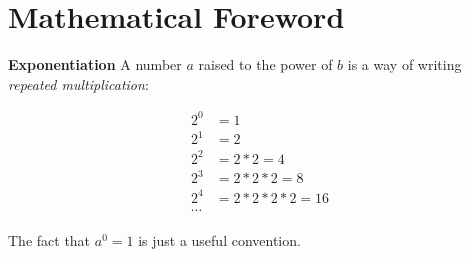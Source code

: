\chapter*{Mathematical Foreword}\label{chpt:mathforeword}

\textbf{Exponentiation} A number $a$ raised to the power of $b$ is a way of
writing \emph{repeated multiplication}:

\begin{align*}
2^0 &= 1\\
2^1 &= 2\\
2^2 &= 2 * 2 = 4\\
2^3 &= 2 * 2 * 2 = 8\\
2^4 &= 2 * 2 * 2 * 2 = 16\\
\cdots
\end{align*}

The fact that $a^0 = 1$ is just a useful convention.

